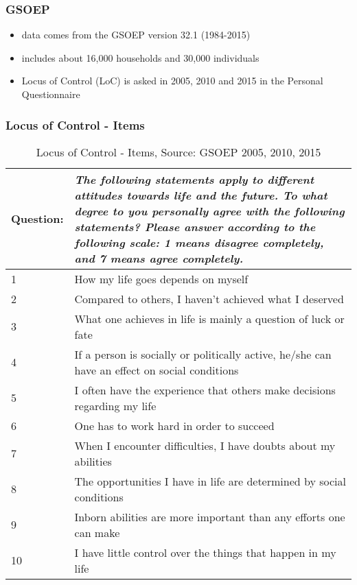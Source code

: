 \documentclass{beamer}
\begin{document}
\begin{frame}[t]\frametitle{GSOEP}

\begin{itemize}
    \item data comes from the GSOEP version 32.1 (1984-2015)
    \item includes about 16,000 households and 30,000 individuals
    \item Locus of Control (LoC) is asked in 2005, 2010 and 2015 in the Personal
  Questionnaire
\end{itemize}


\end{frame}

\begin{frame}[c]\frametitle{Locus of Control - Items}

\begin{table}[H]\tiny
    \begin{tabular}{p{1.5cm} p{8cm}}
    \toprule
    Question: & \textit{The following statements apply to different attitudes
    towards life and the future. To what degree to you personally agree with
    the following statements? Please answer according to the following scale: 1
    means disagree completely, and 7 means agree completely.} \\
    \midrule
    1  & How my life goes depends on myself \\
    2  & Compared to others, I haven't achieved what I deserved \\
    3  & What one achieves in life is mainly a question of luck or fate \\
    4  & If a person is socially or politically active, he/she can have an effect on social conditions \\
    5  & I often have the experience that others make decisions regarding my life \\
    6  & One has to work hard in order to succeed \\
    7  & When I encounter difficulties, I have doubts about my abilities \\
    8  & The opportunities I have in life are determined by social conditions \\
    9  & Inborn abilities are more important than any efforts one can make \\
    10 & I have little control over the things that happen in my life \\
    \bottomrule
    \end{tabular}
    \caption{Locus of Control - Items, Source: GSOEP 2005, 2010, 2015}
    \label{tab:loc_items}
\end{table}


\end{frame}
\end{document}
